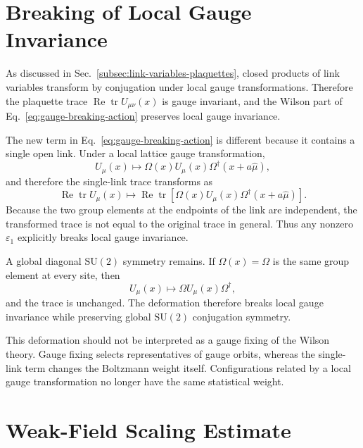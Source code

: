 \documentclass[12pt,a4paper,oneside,numbers=noenddot]{scrreprt}
\newcommand{\SU}{\mathrm{SU}}
\newcommand{\eps}{\varepsilon}
\newcommand{\latspacing}{a}
\begin{document}
\section{Breaking of Local Gauge Invariance}
\label{sec:breaking-local-gauge-invariance}

As discussed in Sec.~\ref{subsec:link-variables-plaquettes}, closed products of
link variables transform by conjugation under local gauge transformations.
Therefore the plaquette trace
\(\operatorname{Re}\operatorname{tr}U_{\mu\nu}(x)\) is gauge invariant, and the
Wilson part of Eq.~\eqref{eq:gauge-breaking-action} preserves local gauge
invariance.

The new term in Eq.~\eqref{eq:gauge-breaking-action} is different because it
contains a single open link. Under a local lattice gauge transformation,
\begin{equation}
  U_\mu(x)
  \mapsto
  \Omega(x)U_\mu(x)\Omega^\dagger(x+\latspacing\hat\mu),
\end{equation}
and therefore the single-link trace transforms as
\begin{equation}
  \operatorname{Re}\operatorname{tr}U_\mu(x)
  \mapsto
  \operatorname{Re}\operatorname{tr}
  \left[
    \Omega(x)U_\mu(x)\Omega^\dagger(x+\latspacing\hat\mu)
  \right].
  \label{eq:single-link-trace-transform}
\end{equation}
Because the two group elements at the endpoints of the link are independent,
the transformed trace is not equal to the original trace in general. Thus any
nonzero \(\eps_1\) explicitly breaks local gauge invariance.

A global diagonal \(\SU(2)\) symmetry remains. If \(\Omega(x)=\Omega\) is the
same group element at every site, then
\begin{equation}
  U_\mu(x)
  \mapsto
  \Omega U_\mu(x)\Omega^\dagger ,
\end{equation}
and the trace is unchanged. The deformation therefore breaks local gauge
invariance while preserving global \(\SU(2)\) conjugation symmetry.

This deformation should not be interpreted as a gauge fixing of the Wilson
theory. Gauge fixing selects representatives of gauge orbits, whereas the
single-link term changes the Boltzmann weight itself. Configurations related by
a local gauge transformation no longer have the same statistical weight.

\section{Weak-Field Scaling Estimate}
\label{sec:weak-field-scaling-estimate}
\end{document}
